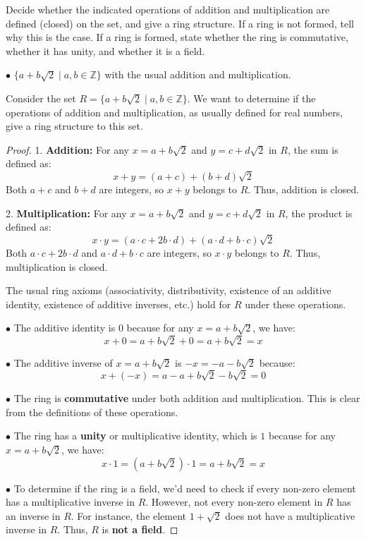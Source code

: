 \documentclass[12pt]{amsart}
\theoremstyle{definition}
\numberwithin{equation}{section}
\theoremstyle{plain}
\newcommand{\Z}{\mathbb{Z}}
\begin{document}
\vspace*{20pt}
\begin{exercise}{11}$ $ \\
    Decide whether the indicated operations of addition and multiplication are defined (closed) on the set, and give a ring structure. 
    If a ring is not formed, tell why this is the case. If a ring is formed, state whether the ring is commutative, whether it has unity, and whether it is a field.

    $\bullet$ $\{a + b\sqrt{2} \mid a, b \in \Z\}$ with the usual addition and multiplication.

    
    Consider the set \( R = \{a + b\sqrt{2} \mid a, b \in\Z\} \). We want to determine if the operations of addition and multiplication, as usually defined for real numbers, give a ring structure to this set.

\begin{proof}
1. \textbf{Addition:} For any \( x = a + b\sqrt{2} \) and \( y = c + d\sqrt{2} \) in \( R \), the sum is defined as:
\[ x + y = (a + c) + (b + d)\sqrt{2} \]
Both \( a + c \) and \( b + d \) are integers, so \( x + y \) belongs to \( R \). Thus, addition is closed.

2. \textbf{Multiplication:} For any \( x = a + b\sqrt{2} \) and \( y = c + d\sqrt{2} \) in \( R \), the product is defined as:
\[ x \cdot y = (a \cdot c + 2b \cdot d) + (a \cdot d + b \cdot c)\sqrt{2} \]
Both \( a \cdot c + 2b \cdot d \) and \( a \cdot d + b \cdot c \) are integers, so \( x \cdot y \) belongs to \( R \). Thus, multiplication is closed.

The usual ring axioms (associativity, distributivity, existence of an additive identity, existence of additive inverses, etc.) hold for \( R \) under these operations.

$\bullet$ The additive identity is \( 0 \) because for any \( x = a + b\sqrt{2} \), we have:
\[ x + 0 = a + b\sqrt{2} + 0 = a + b\sqrt{2} = x \]

$\bullet$ The additive inverse of \( x = a + b\sqrt{2} \) is \( -x = -a - b\sqrt{2} \) because:
\[ x + (-x) = a - a + b\sqrt{2} - b\sqrt{2} = 0 \]

$\bullet$ The ring is \textbf{commutative} under both addition and multiplication. This is clear from the definitions of these operations.

$\bullet$ The ring has a \textbf{unity} or multiplicative identity, which is \( 1 \) because for any \( x = a + b\sqrt{2} \), we have:
\[ x \cdot 1 = (a + b\sqrt{2}) \cdot 1 = a + b\sqrt{2} = x \]

$\bullet$ To determine if the ring is a field, we'd need to check if every non-zero element has a multiplicative inverse in \( R \). However, not every non-zero element in \( R \) has an inverse in \( R \). For instance, the element \( 1 + \sqrt{2} \) does not have a multiplicative inverse in \( R \). Thus, \( R \) is \textbf{not a field}.

\end{proof}
\end{exercise}
\end{document}
